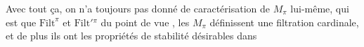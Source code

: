 
Avec tout ça, on n'a toujours pas donné de caractérisation de $M_\pi$ lui-même, qui est  que $\mathrm{Filt}^\pi$ et $\mathrm{Filt}'{}^\pi$ du point de vue ,   les $M_\pi$  définissent une filtration cardinale, et de plus ils ont les propriétés de stabilité désirables dans 
